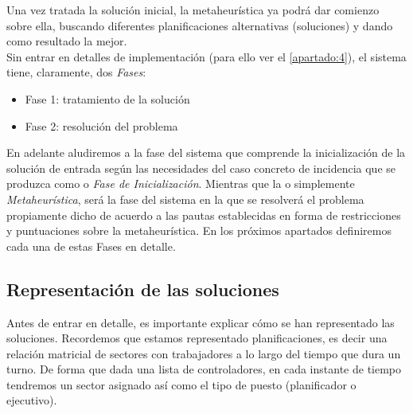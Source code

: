 Una vez tratada la solución inicial, la metaheurística ya podrá dar comienzo sobre ella, buscando diferentes 
planificaciones alternativas (soluciones) y dando como resultado la mejor. 
\\


Sin entrar en detalles de implementación (para ello ver el \autoref{apartado:4}), el sistema tiene, claramente, dos 
\textit{Fases}:
\begin{itemize}
	\item \label{Fase 1} Fase 1: tratamiento de la solución
	\item \label{Fase 2} Fase 2: resolución del problema
\end{itemize}

En adelante aludiremos a la fase del sistema que comprende la inicialización de la solución de entrada según las 
necesidades del caso concreto de incidencia que se produzca como \faseuno{} o \textit{Fase de Inicialización}. 
Mientras que la \fasedos{} o simplemente \textit{Metaheurística}, será la fase del sistema en la que se resolverá el 
problema propiamente dicho de acuerdo a las pautas establecidas en forma de restricciones y puntuaciones sobre la 
metaheurística.
En los próximos apartados definiremos cada una de estas Fases en detalle.

\subsection{Representación de las soluciones}
Antes de entrar en detalle, es importante explicar cómo se han representado las soluciones. Recordemos que estamos 
representado planificaciones, es decir una relación matricial de sectores con trabajadores a lo largo del tiempo que 
dura un turno. De forma que dada una lista de controladores, en cada instante de tiempo tendremos un sector asignado 
así como el tipo de puesto (planificador o ejecutivo).
\\

